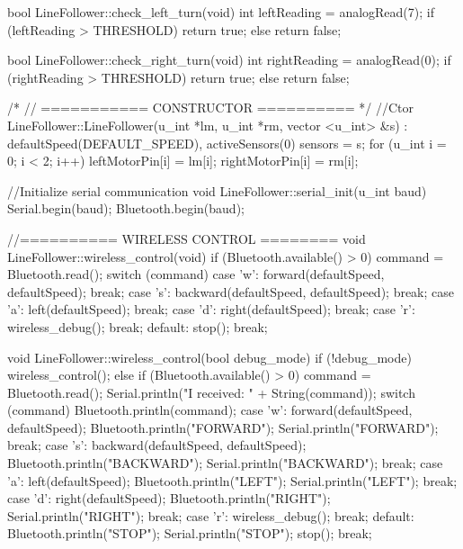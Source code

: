 \documentclass[14pt,a4paper]{extarticle}
\begin{document}
\begin{spverbatim}
bool LineFollower::check_left_turn(void)
{
  int leftReading = analogRead(7);
  if (leftReading > THRESHOLD) return true;
  else return false;
}

bool LineFollower::check_right_turn(void)
{
  int rightReading = analogRead(0);
  if (rightReading > THRESHOLD) return true;
  else return false;
}

/*
//  =========== CONSTRUCTOR ==========
*/
//Ctor
LineFollower::LineFollower(u_int *lm, u_int *rm, vector <u_int> &s)
: defaultSpeed(DEFAULT_SPEED),
  activeSensors(0) {
  sensors = s;
  for (u_int i = 0; i < 2; i++)
  {
    leftMotorPin[i] = lm[i];
    rightMotorPin[i] = rm[i];
  }
}

//Initialize serial communication
void LineFollower::serial_init(u_int baud)
{
  Serial.begin(baud);
  Bluetooth.begin(baud);
}

//========== WIRELESS CONTROL ========
void LineFollower::wireless_control(void)
{
  if (Bluetooth.available() > 0) 
  	command = Bluetooth.read();
  switch (command)
  {
    case 'w':
      forward(defaultSpeed, defaultSpeed);
      break;
    case 's':
      backward(defaultSpeed, defaultSpeed);
      break;
    case 'a':
      left(defaultSpeed);
      break;
    case 'd':
      right(defaultSpeed);
      break;
    case 'r':
      wireless_debug();
      break;
    default:
      stop();
      break;
  }
}

void LineFollower::wireless_control(bool debug_mode)
{
  if (!debug_mode) wireless_control();
  else
  {
    if (Bluetooth.available() > 0){
      command = Bluetooth.read();
      Serial.println("I received: " + String(command));
    }
    switch (command){
      Bluetooth.println(command);
      case 'w':
        forward(defaultSpeed, defaultSpeed);
        Bluetooth.println("FORWARD");
        Serial.println("FORWARD");
        break;
      case 's':
        backward(defaultSpeed, defaultSpeed);
        Bluetooth.println("BACKWARD");
        Serial.println("BACKWARD");
        break;
      case 'a':
        left(defaultSpeed);
        Bluetooth.println("LEFT");
        Serial.println("LEFT");
        break;
      case 'd':
        right(defaultSpeed);
        Bluetooth.println("RIGHT");
        Serial.println("RIGHT");
        break;
      case 'r':
        wireless_debug();
        break;
      default:
        Bluetooth.println("STOP");
        Serial.println("STOP");
        stop();
        break;
    }
  }
}

	\end{spverbatim}
\end{document}
